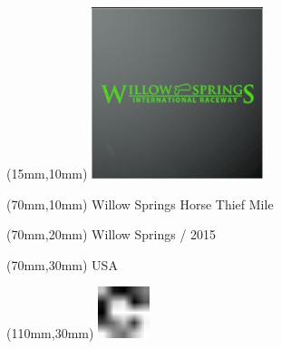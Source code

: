 \null\newpage
\begin{textblock*}{50mm}(15mm,10mm)%
\includegraphics[width=50mm]{LG/2015-05-20_00098.png}
\end{textblock*}
\begin{textblock*}{130mm}(70mm,10mm)%
{\fontsize{20}{20}\selectfont Willow Springs Horse Thief Mile}\\
\end{textblock*}
\begin{textblock*}{120mm}(70mm,20mm)%
{\fontsize{16}{16}\selectfont Willow Springs / 2015}\\
\end{textblock*}
\begin{textblock*}{120mm}(70mm,30mm)%
{\fontsize{12}{12}\selectfont USA}
\end{textblock*}
\begin{textblock*}{30mm}(110mm,30mm)%
\centering
\includegraphics[height=15mm]{icons/fa-rotate-right.pdf}
\end{textblock*}
